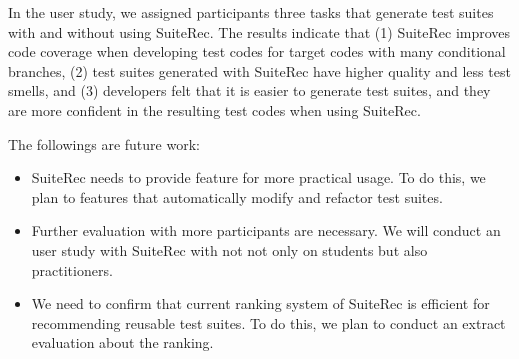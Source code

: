 \documentclass[conference]{IEEEtran}
\begin{document}
In the user study, we assigned participants three tasks that generate test suites with and without using \textsf{SuiteRec}. The results indicate that (1) \textsf{SuiteRec} improves code coverage when developing test codes for target codes with many conditional branches, (2) test suites generated with \textsf{SuiteRec} have higher quality and less test smells, and (3) developers felt that it is easier to generate test suites, and they are more confident in the resulting test codes when using \textsf{SuiteRec}.

The followings are future work:

\begin{itemize}
\item \textsf{SuiteRec} needs to provide feature for more practical usage. To do this, we plan to features that automatically modify and refactor test suites.
\item Further evaluation with more participants are necessary. We will conduct an user study with \textsf{SuiteRec} with not not only on students but also practitioners.
\item We need to confirm that current ranking system of \textsf{SuiteRec} is efficient for recommending reusable test suites. To do this, we plan to conduct an extract evaluation about the ranking.
\end{itemize}

\end{document}
